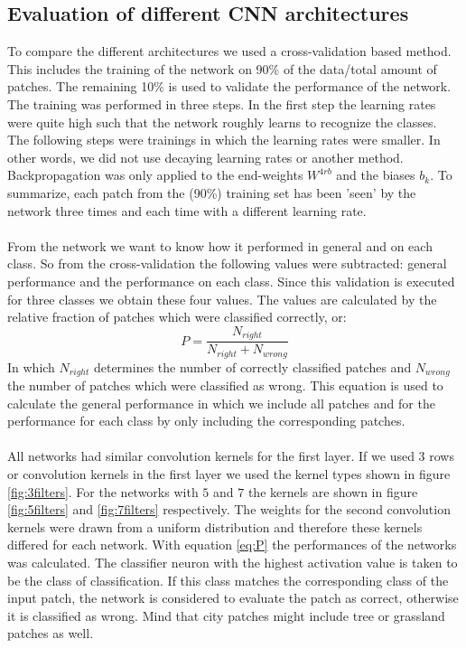 \documentclass[a4paper,onecolumn]{report}
\begin{document}





\begin{appendices}
	
\chapter{Evaluation of different CNN architectures}
\label{app:DiffentArchitectures}
To compare the different architectures we used a cross-validation based method. This includes the training of the network on 90\% of the data/total amount of patches. The remaining 10\% is used to validate the performance of the network. The training was performed in three steps. In the first step the learning rates were quite high such that the network roughly learns to recognize the classes. The following steps were trainings in which the learning rates were smaller. In other words, we did not use decaying learning rates or another method. Backpropagation  was only applied to the end-weights $W^{4rb}$ and the biases $b_{k}$. To summarize, each patch from the (90\%) training set  has been 'seen' by the network three times and each time with a different learning rate. 
\\\\
From the network we want to know how it performed in general and on each class. So from the cross-validation the following values were subtracted: general performance and the performance on each class. Since this validation is executed for three classes we obtain these four values. The values are calculated by the relative fraction of patches which were classified correctly, or:
\begin{equation}
\label{eq:P}
P= \frac{N_{right}}{N_{right}+ N_{wrong}}
\end{equation}
In which $N_{right}$ determines the number of correctly classified patches and $N_{wrong}$ the number of patches which were classified as wrong. This equation is used to calculate the general performance in which we include all patches and for the performance for each class by only including the corresponding patches.
\\\\
All networks had similar convolution kernels for the first layer. If we used $3$ rows or convolution kernels in the first layer we used the kernel types shown in figure \ref{fig:3filters}. For the networks with $5$ and $7$ the kernels are shown in figure \ref{fig:5filters} and \ref{fig:7filters} respectively. The weights for the second convolution kernels were drawn from a uniform distribution and therefore these kernels differed for each network. With equation \ref{eq:P} the performances of the networks was calculated. The classifier neuron with the highest activation value is taken to be the class of classification. If this class matches the corresponding class of the input patch, the network is considered to evaluate the patch as correct, otherwise it is classified as wrong. Mind that city patches might include tree or grassland patches as well.


\end{appendices}
\end{document}
